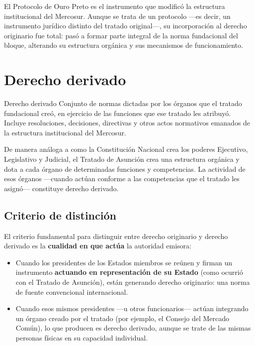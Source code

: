 \documentclass[12pt,oneside]{book}
\begin{document}
El Protocolo de Ouro Preto es el instrumento que modificó la estructura institucional del Mercosur. Aunque se trata de un protocolo —es decir, un instrumento jurídico distinto del tratado original—, su incorporación al derecho originario fue total: pasó a formar parte integral de la norma fundacional del bloque, alterando su estructura orgánica y sus mecanismos de funcionamiento.

\section{Derecho derivado}

\begin{definition}{Derecho derivado}
Conjunto de normas dictadas por los órganos que el tratado fundacional creó, en ejercicio de las funciones que ese tratado les atribuyó. Incluye resoluciones, decisiones, directivas y otros actos normativos emanados de la estructura institucional del Mercosur.
\end{definition}

De manera análoga a como la Constitución Nacional crea los poderes Ejecutivo, Legislativo y Judicial, el Tratado de Asunción crea una estructura orgánica y dota a cada órgano de determinadas funciones y competencias. La actividad de esos órganos —cuando actúan conforme a las competencias que el tratado les asignó— constituye derecho derivado.

\subsection{Criterio de distinción}

El criterio fundamental para distinguir entre derecho originario y derecho derivado es la \textbf{cualidad en que actúa} la autoridad emisora:

\begin{itemize}
\item Cuando los presidentes de los Estados miembros se reúnen y firman un instrumento \textbf{actuando en representación de su Estado} (como ocurrió con el Tratado de Asunción), están generando derecho originario: una norma de fuente convencional internacional.

\item Cuando esos mismos presidentes —u otros funcionarios— actúan integrando un órgano creado por el tratado (por ejemplo, el Consejo del Mercado Común), lo que producen es derecho derivado, aunque se trate de las mismas personas físicas en su capacidad individual.
\end{itemize}
\end{document}
